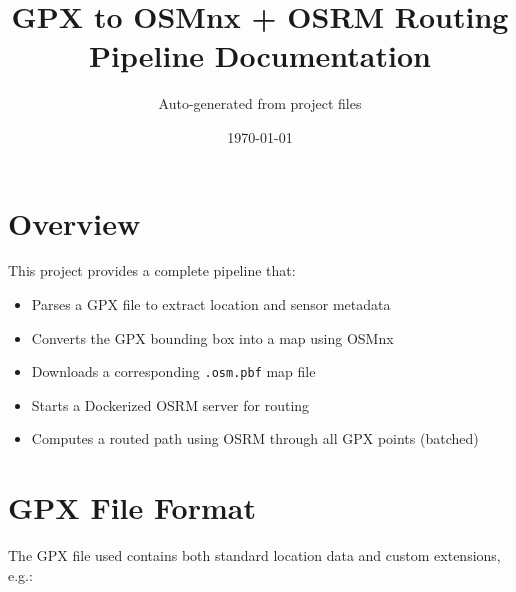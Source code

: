 \documentclass[11pt]{article}
\title{GPX to OSMnx + OSRM Routing Pipeline Documentation}
\author{Auto-generated from project files}
\date{\today}
\begin{document}
\maketitle

\section{Overview}
This project provides a complete pipeline that:
\begin{itemize}
    \item Parses a GPX file to extract location and sensor metadata
    \item Converts the GPX bounding box into a map using OSMnx
    \item Downloads a corresponding \texttt{.osm.pbf} map file
    \item Starts a Dockerized OSRM server for routing
    \item Computes a routed path using OSRM through all GPX points (batched)
\end{itemize}

\section{GPX File Format}
The GPX file used contains both standard location data and custom extensions, e.g.:
\end{document}
